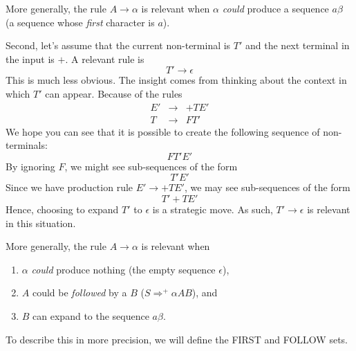 More generally, the rule $A \to \alpha$ is relevant when $\alpha$ \textit{could} produce a sequence $a\beta$ (a sequence whose \textit{first} character is $a$). 

Second, let's assume that the current non-terminal is $T'$ and the next terminal in the input is $+$. A relevant rule is
\[ T' \to \epsilon \]
This is much less obvious. The insight comes from thinking about the context in which $T'$ can appear. Because of the rules
\[\begin{array}{rcl}
     E' & \to & +TE'  \\
     T & \to & FT' 
\end{array}\]
We hope you can see that it is possible to create the following sequence of non-terminals:
\[FT'E'\]
By ignoring $F$, we might see sub-sequences of the form
\[T'E'\]
Since we have production rule $E' \to +TE'$, we may see sub-sequences of the form
\[T'+TE'\]
Hence, choosing to expand $T'$ to $\epsilon$ is a strategic move. As such, $T' \to \epsilon$ is relevant in this situation. 

More generally, the rule $A \to \alpha$ is relevant when 
\begin{enumerate}
    \item $\alpha$ \textit{could} produce nothing (the empty sequence $\epsilon$),
    \item $A$ could be \textit{followed} by a $B$ ($S \Rightarrow^+ \alpha AB$), and
    \item $B$ can expand to the sequence $a\beta$.
\end{enumerate}

To describe this in more precision, we will define the \textsf{FIRST} and \textsf{FOLLOW} sets.

